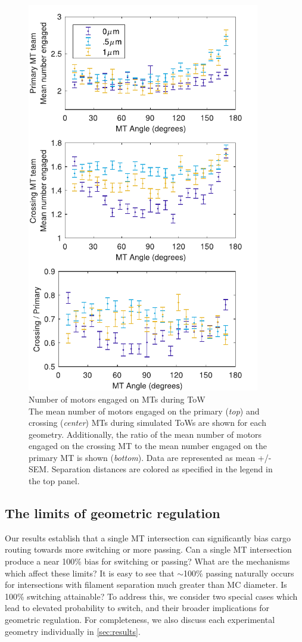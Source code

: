 \begin{figure}
\centering
\includegraphics[width=4in]{appendix2/num_engagedEXP.pdf}
\caption[Number of motors engaged on MTs during ToW]{ Number of motors engaged on MTs during ToW\\
The mean number of motors engaged on the primary (\textit{top}) and crossing (\textit{center}) MTs during simulated ToWs are shown for each geometry. Additionally, the ratio of the mean number of motors engaged on the crossing MT to the mean number engaged on the primary MT is shown (\textit{bottom}). Data are represented as mean +/- SEM. Separation distances are colored as specified in the legend in the top panel.
} \label{fig:num_engagedEXP}
\end{figure}

\subsection{The limits of geometric regulation}

Our results establish that a single MT intersection can significantly bias cargo routing towards more switching or more passing. Can a single MT intersection produce a near 100\% bias for switching or passing? What are the mechanisms which affect these limits? It is easy to see that $\sim$100\% passing naturally occurs for intersections with filament separation much greater than MC diameter. Is 100\% switching attainable? To address this, we consider two special cases which lead to elevated probability to switch, and their broader implications for geometric regulation. For completeness, we also discuss each experimental geometry individually in \ref{sec:results}.

